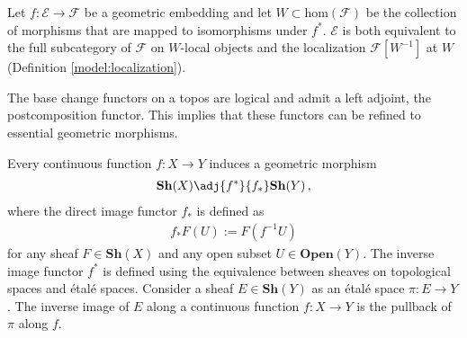     \begin{property}\label{topos:characterization_embedding}
        Let $f:\mathcal{E}\rightarrow\mathcal{F}$ be a geometric embedding and let $W\subset\mathrm{hom}(\mathcal{F})$ be the collection of morphisms that are mapped to isomorphisms under $f^*$. $\mathcal{E}$ is both equivalent to the full subcategory of $\mathcal{F}$ on $W$-local objects and the localization $\mathcal{F}[W^{-1}]$ at $W$ (Definition \ref{model:localization}).
    \end{property}

    \begin{property}
        The base change functors on a topos are logical and admit a left adjoint, the postcomposition functor. This implies that these functors can be refined to essential geometric morphisms.
    \end{property}

    \begin{example}\label{topos:topological_spaces}
        Every continuous function $f:X\rightarrow Y$ induces a geometric morphism
        \begin{gather}
            \mathbf{Sh}(X)\adj{f^*}{f_*}\mathbf{Sh}(Y)\,,
        \end{gather}
        where the direct image functor $f_*$ is defined as
        \begin{gather}
            f_*F(U) := F(f^{-1}U)
        \end{gather}
        for any sheaf $F\in\mathbf{Sh}(X)$ and any open subset $U\in\mathbf{Open}(Y)$. The inverse image functor $f^*$ is defined using the equivalence between sheaves on topological spaces and \'etal\'e spaces. Consider a sheaf $E\in\mathbf{Sh}(Y)$ as an \'etal\'e space $\pi:E\rightarrow Y$. The inverse image of $E$ along a continuous function $f:X\rightarrow Y$ is the pullback of $\pi$ along $f$.
    \end{example}

